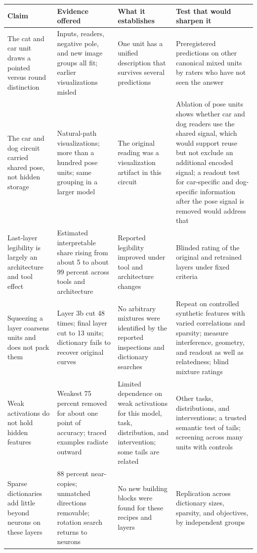 \documentclass[11pt]{article}
\begin{document}
{\small
\begin{longtable}{@{}p{}p{}p{}p{}@{}}
\toprule
Claim & Evidence offered & What it establishes & Test that would sharpen it\\
\midrule
\endhead
The cat and car unit draws a pointed versus round distinction & Inputs, readers, negative pole, and new image groups all fit; earlier visualizations misled & One unit has a unified description that survives several predictions & Preregistered predictions on other canonical mixed units by raters who have not seen the answer\\
\addlinespace
The car and dog circuit carried shared pose, not hidden storage & Natural-path visualizations; more than a hundred pose units; same grouping in a larger model & The original reading was a visualization artifact in this circuit & Ablation of pose units shows whether car and dog readers use the shared signal, which would support reuse but not exclude an additional encoded signal; a readout test for car-specific and dog-specific information after the pose signal is removed would address that\\
\addlinespace
Last-layer legibility is largely an architecture and tool effect & Estimated interpretable share rising from about 5 to about 99 percent across tools and architecture & Reported legibility improved under tool and architecture changes & Blinded rating of the original and retrained layers under fixed criteria\\
\addlinespace
Squeezing a layer coarsens units and does not pack them & Layer 3b cut 48 times; final layer cut to 13 units; dictionary fails to recover original curves & No arbitrary mixtures were identified by the reported inspections and dictionary searches & Repeat on controlled synthetic features with varied correlations and sparsity; measure interference, geometry, and readout as well as relatedness; blind mixture ratings\\
\addlinespace
Weak activations do not hold hidden features & Weakest 75 percent removed for about one point of accuracy; traced examples radiate outward & Limited dependence on weak activations for this model, task, distribution, and intervention; some tails are related & Other tasks, distributions, and interventions; a trusted semantic test of tails; screening across many units with controls\\
\addlinespace
Sparse dictionaries add little beyond neurons on these layers & 88 percent near-copies; unmatched directions removable; rotation search returns to neurons & No new building blocks were found for these recipes and layers & Replication across dictionary sizes, sparsity, and objectives, by independent groups\\

\end{longtable}}
\end{document}
